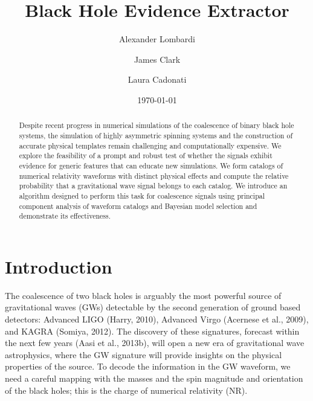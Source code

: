 \documentclass[%
 reprint,
 amsmath,amssymb,
 aps,
]{revtex4-1}
\begin{document}

\title{Black Hole Evidence Extractor}%

\author{Alexander Lombardi}
\author{James Clark}
\author{Laura Cadonati}

\date{\today}

\begin{abstract}
Despite recent progress in numerical simulations of the coalescence of binary black hole systems, the simulation of highly asymmetric spinning systems and the construction of accurate physical templates remain challenging and computationally expensive. We explore the feasibility of a prompt and robust test of whether the signals exhibit evidence for generic features that can educate new simulations. We form catalogs of numerical relativity waveforms with distinct physical effects and compute the relative probability that a gravitational wave signal belongs to each catalog. We introduce an algorithm designed to perform this task for coalescence signals using principal component analysis of waveform catalogs and Bayesian model selection and demonstrate its effectiveness.
\end{abstract}

\maketitle


\section{Introduction}
The coalescence of two black holes is arguably the most powerful source of gravitational waves (GWs) detectable by the second generation of ground based detectors: Advanced LIGO (Harry, 2010), Advanced Virgo (Acernese et al., 2009), and KAGRA (Somiya, 2012). The discovery of these signatures, forecast within the next few years (Aasi et al., 2013b), will open a new era of gravitational wave astrophysics, where the GW signature will provide insights on the physical properties of the source. To decode the information in the GW waveform, we need a careful mapping with the masses and the spin magnitude and orientation of the black holes; this is the charge of numerical relativity (NR).
\end{document}
